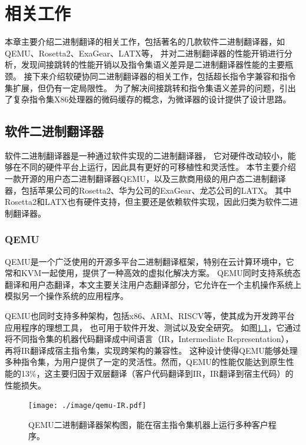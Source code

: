 \chapter{相关工作}\label{chap:related_work}

本章主要介绍二进制翻译的相关工作，包括著名的几款软件二进制翻译器，如QEMU、Rosetta2、ExaGear、LATX等，
并对二进制翻译器的性能开销进行分析，发现间接跳转的性能开销以及指令集语义差异是二进制翻译器性能的主要瓶颈。
接下来介绍软硬协同二进制翻译器的相关工作，包括超长指令字兼容和指令集扩展，但仍有一定局限性。
为了解决间接跳转和指令集语义差异的问题，引出了复杂指令集X86处理器的微码缓存的概念，为微译器的设计提供了设计思路。

\section{软件二进制翻译器}

软件二进制翻译器是一种通过软件实现的二进制翻译器，
它对硬件改动较小，能够在不同的硬件平台上运行，因此具有更好的可移植性和灵活性。
本节主要介绍一款开源的用户态二进制翻译器QEMU，以及三款商用级的用户态二进制翻译器，包括苹果公司的Rosetta2、华为公司的ExaGear、龙芯公司的LATX。
其中Rosetta2和LATX也有硬件支持，但主要还是依赖软件实现，因此归类为软件二进制翻译器。

\subsection{QEMU}

QEMU是一个广泛使用的开源多平台二进制翻译框架，特别在云计算环境中，它常和KVM一起使用，提供了一种高效的虚拟化解决方案。
QEMU同时支持系统态翻译和用户态翻译，本文主要关注用户态翻译部分，它允许在一个主机操作系统上模拟另一个操作系统的应用程序。

QEMU也同时支持多种架构，包括x86、ARM、RISCV等，使其成为开发跨平台应用程序的理想工具， 也可用于软件开发、测试以及安全研究。
如图\ref{img:qemu_arch}，它通过将不同指令集的机器代码翻译成中间语言（IR，Intermediate Representation），再将IR翻译成宿主指令集，实现跨架构的兼容性。
这种设计使得QEMU能够处理多种指令集，为用户提供了一定的灵活性。然而，QEMU的性能仅能达到原生性能的13\%，这主要归因于双层翻译（客户代码翻译到IR，IR翻译到宿主代码）的性能损失。

\begin{figure}[!htbp]
  \centering
  \texttt{[image: ./image/qemu-IR.pdf]}
  \caption{QEMU二进制翻译器架构图，能在宿主指令集机器上运行多种客户程序。}
  \label{img:qemu_arch}
\end{figure}

